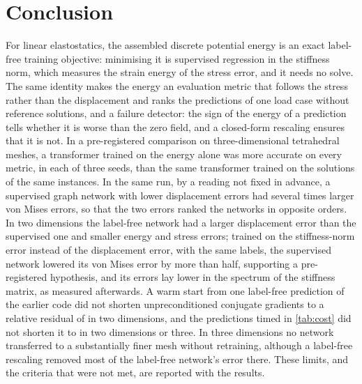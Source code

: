 \section{Conclusion}\label{sec:conclusion}

For linear elastostatics, the assembled discrete potential energy is an exact label-free
training objective: minimising it is supervised regression in the stiffness norm, which
measures the strain energy of the stress error, and it needs no solve. The same identity
makes the energy an evaluation metric that follows the stress rather than the displacement
and ranks the predictions of one load case without reference solutions, and a failure
detector: the sign of the
energy of a prediction tells whether it is worse than the zero field, and a closed-form
rescaling ensures that it is not. In a pre-registered comparison on three-dimensional
tetrahedral meshes, a transformer trained on the energy alone was more accurate on every
metric, in each of three seeds, than the same transformer trained on the solutions of the
same instances. In the same run, by a reading not fixed in advance, a supervised graph
network with lower displacement errors had several times larger
von Mises errors, so that the two errors ranked the networks in opposite orders. In two
dimensions the label-free network had a larger displacement error than the supervised one
and smaller energy and stress errors; trained on the stiffness-norm error instead of the
displacement error, with the same labels, the supervised network lowered its von Mises error
by more than half, supporting a pre-registered hypothesis, and its errors lay lower in the
spectrum of the stiffness matrix, as measured afterwards. A warm start from one label-free
prediction of the earlier code did not shorten unpreconditioned conjugate gradients to a
relative residual of \numKfiveTol{} in two dimensions, and the predictions timed in
\cref{tab:cost} did not shorten it to \numCostCgTol{} in two dimensions or three. In three dimensions no network
transferred to a substantially finer mesh without retraining, although a label-free
rescaling removed most of the label-free network's error there. These limits, and the
criteria that were not met, are reported with the results.
